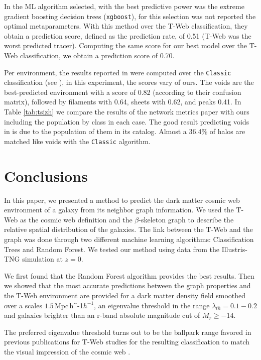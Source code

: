 \documentclass[usenatbib]{mnras}
\newcommand{\Mpch}{\,{\rm Mpc}\,\ifmmode h^{-1}\else $h^{-1}$\fi}
\begin{document}
In \citep{Tsizh2019} the ML algorithm selected, with the best
predictive power was the extreme gradient boosting decision trees (\texttt{xgboost}), for
this selection was not reported the optimal metaparameters. With this
method over the T-Web classification, they obtain a prediction score,
defined as the prediction rate, of 0.51 (T-Web was the worst predicted
tracer). Computing the same score for our best model over the T-Web
classification, we obtain a prediction score of 0.70. 

Per environment, the results reported in \citep{Tsizh2019} were
computed over the \texttt{Classic} classification (see
\citep{Libeskind2018}), in this experiment, the scores vary of
ours. The voids are the best-predicted environment with a score of
0.82 (according to their confusion matrix), followed by filaments with
0.64, sheets with 0.62, and peaks 0.41. In Table \ref{tab:tsizh} we
compare the results of the network metrics paper with ours including
the population by class in each case. The good result predicting voids
in \citep{Tsizh2019} is due to the population of them in its
catalog. Almost a 36.4\% of halos are matched like voids with the
\texttt{Classic} algorithm.  


\section{Conclusions}\label{sec:conclusions}

In this paper, we presented a method to predict the dark matter cosmic web environment of a galaxy from its neighbor graph information.
We used the T-Web as the cosmic web definition \citep{Forero-Romero2009} and the $\beta$-skeleton graph \citep{Fang2019} 
to describe the relative spatial distribution of the galaxies. 
The link between the T-Web and the graph was done through two different
machine learning algorithms: Classification Trees and Random Forest.
We tested our method using data from the Illustris-TNG simulation \citep{Nelson2019} at $z=0$. 

We first found that the Random Forest algorithm provides the best results.
Then we showed that the most accurate predictions between the graph properties and the T-Web environment are provided for a dark matter density field smoothed over a scales $1.5$\Mpch, an eigenvalue threshold in the range $\lambda_{th}=0.1-0.2$ and galaxies brighter than an r-band absolute magnitude cut of $M_r\geq-14$. 

The preferred eigenvalue threshold turns out to be the ballpark range favored in previous publications for T-Web studies for the resulting classification to match the visual impression of the cosmic web \citep{Forero-Romero2009}.
\end{document}
